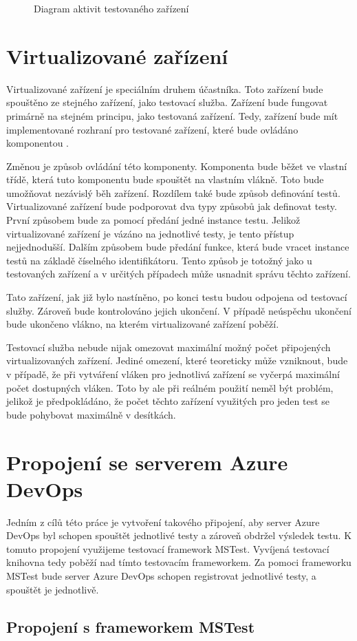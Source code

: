 \begin{figure}
    \caption{Diagram aktivit testovaného zařízení}
    \label{fig:act_diag_device}
\end{figure}


\section{Virtualizované zařízení}
Virtualizované zařízení je speciálním druhem účastníka. Toto zařízení bude spouštěno ze stejného zařízení, jako testovací služba. Zařízení bude fungovat primárně na stejném principu, jako testovaná zařízení. Tedy, zařízení bude mít implementované rozhraní pro testované zařízení, které bude ovládáno komponentou . 

Změnou je způsob ovládání této komponenty. Komponenta bude běžet ve vlastní třídě, která tuto komponentu bude spouštět na vlastním vlákně. Toto bude umožňovat nezávislý běh zařízení. Rozdílem také bude způsob definování testů. Virtualizované zařízení bude podporovat dva typy způsobů jak definovat testy. První způsobem bude za pomocí předání jedné instance testu. Jelikož virtualizované zařízení je vázáno na jednotlivé testy, je tento přístup nejjednodušší. Dalším způsobem bude předání funkce, která bude vracet instance testů na základě číselného identifikátoru. Tento způsob je totožný jako u testovaných zařízení a v určitých případech může usnadnit správu těchto zařízení. 

Tato zařízení, jak již bylo nastíněno, po konci testu budou odpojena od testovací služby. Zároveň bude kontrolováno jejich ukončení. V případě neúspěchu ukončení bude ukončeno vlákno, na kterém virtualizované zařízení poběží.

Testovací služba nebude nijak omezovat maximální možný počet připojených virtualizovaných zařízení. Jediné omezení, které teoreticky může vzniknout, bude v případě, že při vytváření vláken pro jednotlivá zařízení se vyčerpá maximální počet dostupných vláken. Toto by ale při reálném použití neměl být problém, jelikož je předpokládáno, že počet těchto zařízení využitých pro jeden test se bude pohybovat maximálně v desítkách. 


\section{Propojení se serverem Azure DevOps}

Jedním z cílů této práce je vytvoření takového připojení, aby server Azure DevOps byl schopen spouštět jednotlivé testy a zároveň obdržel výsledek testu. K tomuto propojení využijeme testovací framework MSTest. Vyvíjená testovací knihovna tedy poběží nad tímto testovacím frameworkem. Za pomoci frameworku MSTest bude server Azure DevOps schopen registrovat jednotlivé testy, a spouštět je jednotlivě.

\subsection{Propojení s frameworkem MSTest}


